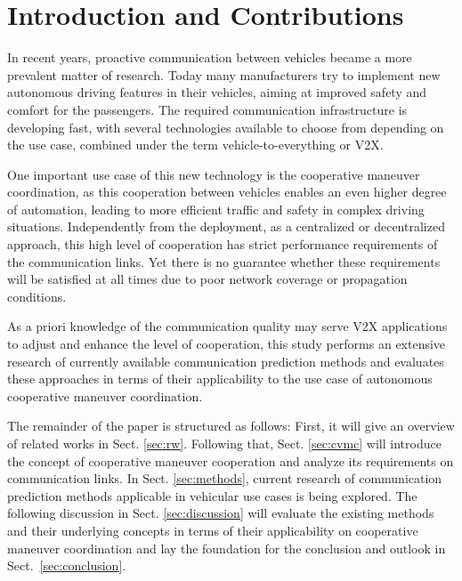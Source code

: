 \documentclass[conference]{IEEEtran}
\begin{document}




%
\IEEEpeerreviewmaketitle



\section{Introduction and Contributions}
\label{sec:introduction}
In recent years, proactive communication between vehicles became a more prevalent matter of research. Today many manufacturers try to implement new autonomous driving features in their vehicles, aiming at improved safety and comfort for the passengers. The required communication infrastructure is developing fast, with several technologies available to choose from depending on the use case, combined under the term vehicle-to-everything or V2X.

One important use case of this new technology is the cooperative maneuver coordination, as this cooperation between vehicles enables an even higher degree of automation, leading to more efficient traffic and safety in complex driving situations. Independently from the deployment, as a centralized or decentralized approach, this high level of cooperation has strict performance requirements of the communication links. Yet there is no guarantee whether these requirements will be satisfied at all times due to poor network coverage or propagation conditions.

As a priori knowledge of the communication quality may serve V2X applications to adjust and enhance the level of cooperation, this study performs an extensive research of currently available communication prediction methods and evaluates these approaches in terms of their applicability to the use case of autonomous cooperative maneuver coordination.

The remainder of the paper is structured as follows: First, it will give an overview of related works in Sect. \ref{sec:rw}. Following that, Sect. \ref{sec:cvmc} will introduce the concept of cooperative maneuver cooperation and analyze its requirements on communication links. In Sect. \ref{sec:methods}, current research of communication prediction methods applicable in vehicular use cases is being explored. The following discussion in Sect. \ref{sec:discussion} will evaluate the existing methods and their underlying concepts in terms of their applicability on cooperative maneuver coordination and lay the foundation for the conclusion and outlook in Sect.~\ref{sec:conclusion}.
\end{document}
